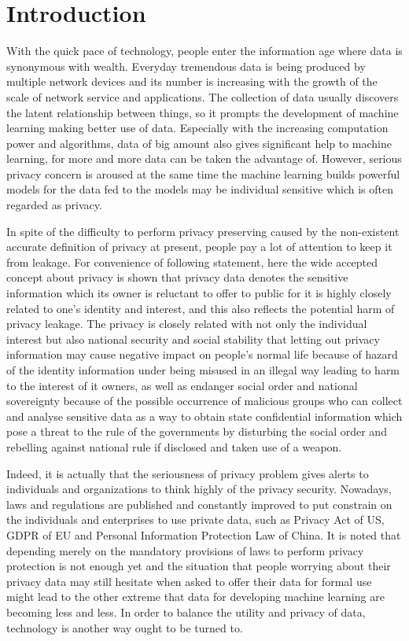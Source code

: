 \documentclass[conference]{IEEEtran}
\begin{document}
\section{Introduction}
With the quick pace of technology, people enter the information age where data is synonymous with wealth. Everyday tremendous data is being produced by multiple network devices and its number is increasing with the growth of the scale of network service and applications. The collection of data usually discovers the latent relationship between things, so it prompts the development of machine learning making better use of data. Especially with the increasing computation power and algorithms, data of big amount also gives significant help to machine learning, for more and more data can be taken the advantage of. However, serious privacy concern is aroused at the same time the machine learning builds powerful models for the data fed to the models may be individual sensitive which is often regarded as privacy.

In spite of the difficulty to perform privacy preserving caused by the non-existent accurate definition of privacy at present, people pay a lot of attention to keep it from leakage. For convenience of following statement, here the wide accepted concept about privacy is shown that privacy data denotes the sensitive information which its owner is reluctant to offer to public for it is highly closely related to one's identity and interest, and this also reflects the potential harm of privacy leakage. The privacy is closely related with not only the individual interest but also national security and social stability that letting out privacy information may cause negative impact on people's normal life because of hazard of the identity information under being misused in an illegal way leading to harm to the interest of it owners, as well as endanger social order and national sovereignty because of the possible occurrence of malicious groups who can collect and analyse sensitive data as a way to obtain state confidential information which pose a threat to the rule of the governments by disturbing the social order and rebelling against national rule if disclosed and taken use of a weapon. 

Indeed, it is actually that the seriousness of privacy problem gives alerts to individuals and organizations to think highly of the privacy security. Nowadays, laws and regulations are published and constantly improved to put constrain on the individuals and enterprises to use private data, such as Privacy Act of US, GDPR of EU and Personal Information Protection Law of China. It is noted that depending merely on the mandatory provisions of laws to perform privacy protection is not enough yet and the situation that people worrying about their privacy data may still hesitate when asked to offer their data for formal use might lead to the other extreme that data for developing machine learning are becoming less and less. In order to balance the utility and privacy of data, technology is another way ought to be turned to.\cite{b1} 
\end{document}
